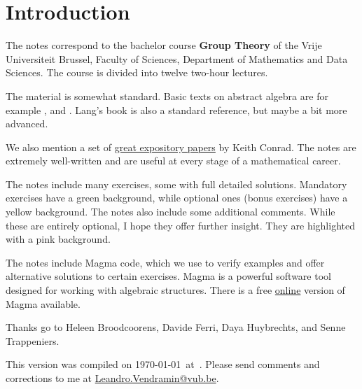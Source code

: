 \thispagestyle{plain}

\section*{Introduction}

The notes correspond to the bachelor 
course \textbf{Group Theory} of the 
Vrije Universiteit Brussel, 
Faculty of Sciences, 
Department of Mathematics and Data Sciences. The course
is divided into twelve two-hour lectures. 



The material is somewhat standard. Basic texts on abstract algebra
are for example \cite{MR1129886}, \cite{MR2286236} and \cite{MR600654}. 
Lang's book \cite{MR783636} is also a standard reference, but 
maybe a bit more advanced. 

We also mention a set of 
\href{https://kconrad.math.uconn.edu/blurbs/}{great expository papers} by Keith Conrad. 
The notes are extremely well-written and are useful at  
every stage of a mathematical career. 

The notes include many exercises, some with full detailed solutions. Mandatory exercises have a \colorbox{green!5!white}{green background}, while optional ones (bonus exercises) have a \colorbox{yellow!15!white}{yellow background}.
The notes also include some additional comments. While these are entirely optional, I hope they offer further insight. They are highlighted with a \colorbox{red!5!white}{pink background}.


The notes include Magma code, which we use to verify examples and offer alternative solutions to certain exercises. Magma \cite{zbMATH01077111} is a powerful software tool designed for working with algebraic structures. There is a free \href{https://magma.maths.usyd.edu.au/calc/}{online} version of Magma available.



 Thanks go to Heleen Broodcoorens, Davide Ferri,
 Daya Huybrechts, and 
 Senne Trappeniers. 
 

This version 
was compiled on \today~at~\currenttime. 
Please send comments and corrections to me at \url{Leandro.Vendramin@vub.be}. 


